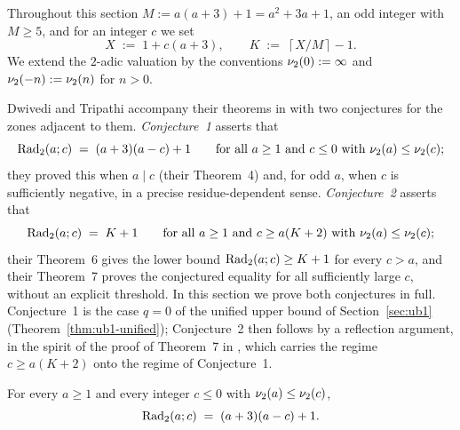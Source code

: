 
Throughout this section $M := a(a+3) + 1 = a^2 + 3a + 1$, an odd integer with
$M \ge 5$, and for an integer $c$ we set
\[
X \;:=\; 1 + c(a+3), \qquad K \;:=\; \left\lceil X/M \right\rceil - 1 .
\]
We extend the $2$-adic valuation by the conventions $\nu_2(0) := \infty$ and
$\nu_2(-n) := \nu_2(n)$ for $n > 0$.

Dwivedi and Tripathi accompany their theorems in \cite{DT2020} with two
conjectures for the zones adjacent to them. \emph{Conjecture~1} asserts that
\[
\mathrm{Rad}_2(a;c) \;=\; (a+3)(a-c) + 1
\qquad \text{for all } a \ge 1 \text{ and } c \le 0 \text{ with }
\nu_2(a) \le \nu_2(c);
\]
they proved this when $a \mid c$ (their Theorem~4) and, for odd $a$, when $c$
is sufficiently negative, in a precise residue-dependent sense.
\emph{Conjecture~2} asserts that
\[
\mathrm{Rad}_2(a;c) \;=\; K + 1
\qquad \text{for all } a \ge 1 \text{ and } c \ge a(K+2) \text{ with }
\nu_2(a) \le \nu_2(c);
\]
their Theorem~6 gives the lower bound $\mathrm{Rad}_2(a;c) \ge K+1$ for every $c > a$,
and their Theorem~7 proves the conjectured equality for all sufficiently
large $c$, without an explicit threshold. In this section we prove both
conjectures in full. Conjecture~1 is the case $q = 0$ of the unified upper
bound of Section~\ref{sec:ub1} (Theorem~\ref{thm:ub1-unified});
Conjecture~2 then follows by a reflection argument, in the spirit of the
proof of Theorem~7 in \cite{DT2020}, which carries the regime
$c \ge a(K+2)$ onto the regime of Conjecture~1.

\begin{theorem}\label{thm:c1}
For every $a \ge 1$ and every integer $c \le 0$ with
$\nu_2(a) \le \nu_2(c)$,
\[
\mathrm{Rad}_2(a;c) \;=\; (a+3)(a-c) + 1 .
\]
\end{theorem}

